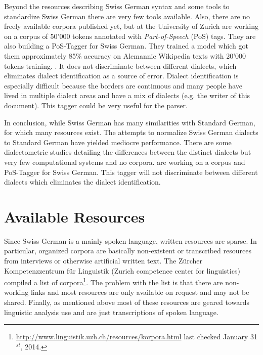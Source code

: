 \documentclass[11pt,letterpaper, covington]{article}
\begin{document}
Beyond the resources describing Swiss German syntax and some tools to standardize Swiss German there are very few tools available. Also, there are no freely available corpora published yet, but \citet{AH14} at the University of Zurich are working on a corpus of 50'000 tokens annotated with \emph{Part-of-Speech} (PoS) tags. They are also building a PoS-Tagger for Swiss German. They trained a model which got them approximately 85\% accuracy on Alemannic Wikipedia texts with 20'000 tokens training. \citep{AH12}. It does not discriminate between different dialects, which eliminates dialect identification as a source of error. Dialect identification is especially difficult because the borders are continuous and many people have lived in multiple dialect areas and have a mix of dialects (e.g. the writer of this document). This tagger could be very useful for the parser.

In conclusion, while Swiss German has many similarities with Standard German, for which many resources exist. The attempts to normalize Swiss German dialects to Standard German have yielded mediocre performance. There are some dialectometric studies detailing the differences between the distinct dialects but very few computational systems and no corpora. \citet{AH14} are working on a corpus and PoS-Tagger for Swiss German. This tagger will not discriminate between different dialects which eliminates the dialect identification.

\section{Available Resources}

Since Swiss German is a mainly spoken language, written resources are sparse. In particular, organized corpora are basically non-existent or transcribed resources from interviews or otherwise artificial written text. The Zürcher Kompetenzzentrum für Linguistik (Zurich competence center for linguistics) compiled a list of corpora\footnote{\url{http://www.linguistik.uzh.ch/resources/korpora.html} last checked January 31$^{st}$, 2014.}. The problem with the list is that there are non-working links and most resources are only available on request and may not be shared. Finally, as mentioned above most of these resources are geared towards linguistic analysis use and are just transcriptions of spoken language. 
\end{document}
